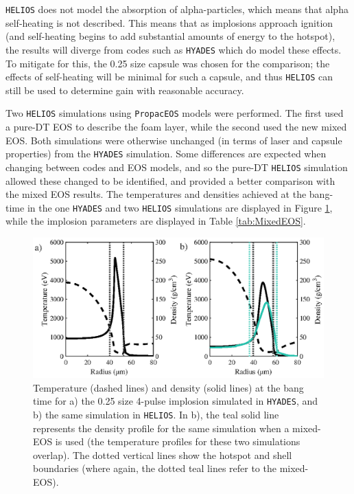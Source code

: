 \texttt{HELIOS} does not model the absorption of alpha-particles, which means that alpha self-heating is not described. This means that as implosions approach ignition (and self-heating begins to add substantial amounts of energy to the hotspot), the results will diverge from codes such as \texttt{HYADES} which do model these effects. To mitigate for this, the 0.25 size capsule was chosen for the comparison; the effects of self-heating will be minimal for such a capsule, and thus \texttt{HELIOS} can still be used to determine gain with reasonable accuracy.

Two \texttt{HELIOS} simulations using \texttt{PropacEOS} models were performed. The first used a pure-DT EOS to describe the foam layer, while the second used the new mixed EOS. Both simulations were otherwise unchanged (in terms of laser and capsule properties) from the \texttt{HYADES} simulation. Some differences are expected when changing between codes and EOS models, and so the pure-DT \texttt{HELIOS} simulation allowed these changed to be identified, and provided a better comparison with the mixed EOS results. The temperatures and densities achieved at the bang-time in the one \texttt{HYADES} and two \texttt{HELIOS} simulations are displayed in Figure \ref{fig:MixedEOS}, while the implosion parameters are displayed in Table \ref{tab:MixedEOS}.

\begin{figure} 
	\centering     %
	\includegraphics[width=.8\textwidth]{figures/FurtherSims/MixedEOS.eps}
	\caption{\label{fig:MixedEOS} Temperature (dashed lines) and density (solid lines) at the bang time for a) the 0.25 size 4-pulse implosion simulated in \texttt{HYADES}, and b) the same simulation in \texttt{HELIOS}. In b), the teal solid line represents the density profile for the same simulation when a mixed-EOS is used (the temperature profiles for these two simulations overlap). The dotted vertical lines show the hotspot and shell boundaries (where again, the dotted teal lines refer to the mixed-EOS).}
\end{figure}

